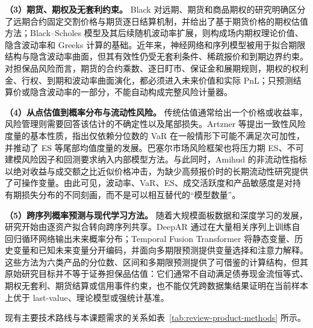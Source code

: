 \textbf{（3）期货、期权及无套利约束。}
Black 对远期、期货和商品期权的研究明确区分了远期合约固定交割价格与期货逐日结算机制，并给出了基于期货价格的期权估值方法\cite{black_1976}；Black--Scholes 模型及其后续随机波动率扩展，则构成场内期权理论价值、隐含波动率和 Greeks 计算的基础\cite{black_scholes_1973,heston_1993}。近年来，神经网络和序列模型被用于拟合期限结构与隐含波动率曲面，但其有效性仍受无套利条件、稀疏报价和到期边界约束。对担保品风险而言，期货的合约乘数、逐日盯市、保证金和展期规则，期权的权利金、行权、到期和波动率曲面演化，都必须进入未来价值和实际 PnL；只预测结算价或隐含波动率的一部分，不能自动构成完整风险计量器。

\textbf{（4）从点估值到概率分布与流动性风险。}
传统估值通常给出一个价格或收益率，风险管理则需要回答该估计的不确定性以及尾部损失。Artzner 等提出一致性风险度量的基本性质，指出仅依赖分位数的 VaR 在一般情形下可能不满足次可加性，并推动了 ES 等尾部均值度量的发展\cite{artzner_1999}。巴塞尔市场风险框架也将压力期 ES、不可建模风险因子和回测要求纳入内部模型方法\cite{bcbs_2019_market_risk}。与此同时，Amihud 的非流动性指标以绝对收益与成交额之比近似价格冲击，为缺少高频报价时的长期流动性研究提供了可操作变量\cite{amihud_2002}。由此可见，波动率、VaR、ES、成交活跃度和产品敏感度是对持有期损失分布的不同刻画，而不是可以相互替代的“模型数量”。

\textbf{（5）跨序列概率预测与现代学习方法。}
随着大规模面板数据和深度学习的发展，研究开始由逐资产拟合转向跨序列共享。DeepAR 通过在大量相关序列上训练自回归循环网络输出未来概率分布\cite{salinas_2020_deepar}；Temporal Fusion Transformer 将静态变量、历史变量和已知未来变量分开编码，并面向多期限预测提供变量选择和注意力解释\cite{lim_2021_tft}。这些方法为六类产品的分位数、区间和多期限预测提供了可借鉴的计算结构，但其原始研究目标并不等于证券担保品估值：它们通常不自动满足债券现金流恒等式、期权无套利、期货结算或信用事件约束，也不能仅凭跨数据集结果证明在当前样本上优于 last-value、理论模型或强统计基准。

现有主要技术路线与本课题需求的关系如表~\ref{tab:review-product-methods} 所示。

